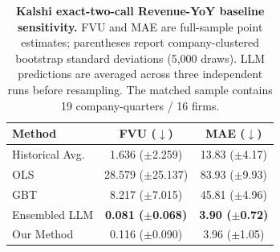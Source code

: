 \begin{table}[t]
\centering
\caption{\textbf{Kalshi exact-two-call Revenue-YoY baseline sensitivity.}
FVU and MAE are full-sample point estimates; parentheses report company-clustered
bootstrap standard deviations (5,000 draws). LLM predictions are averaged across three
independent runs before resampling. The matched sample contains 19 company-quarters / 16 firms.}
\label{tab:kalshi_baselines_exact_two_call}
\begin{tabular}{lcc}
\toprule
Method & FVU ($\downarrow$) & MAE ($\downarrow$) \\
\midrule
Historical Avg. & 1.636 ($\pm$2.259) & 13.83 ($\pm$4.17) \\
OLS & 28.579 ($\pm$25.137) & 83.93 ($\pm$9.93) \\
GBT & 8.217 ($\pm$7.015) & 45.81 ($\pm$4.96) \\
Ensembled LLM & \textbf{0.081 ($\pm$0.068)} & \textbf{3.90 ($\pm$0.72)} \\
Our Method & 0.116 ($\pm$0.090) & 3.96 ($\pm$1.05) \\
\bottomrule
\end{tabular}
\end{table}
